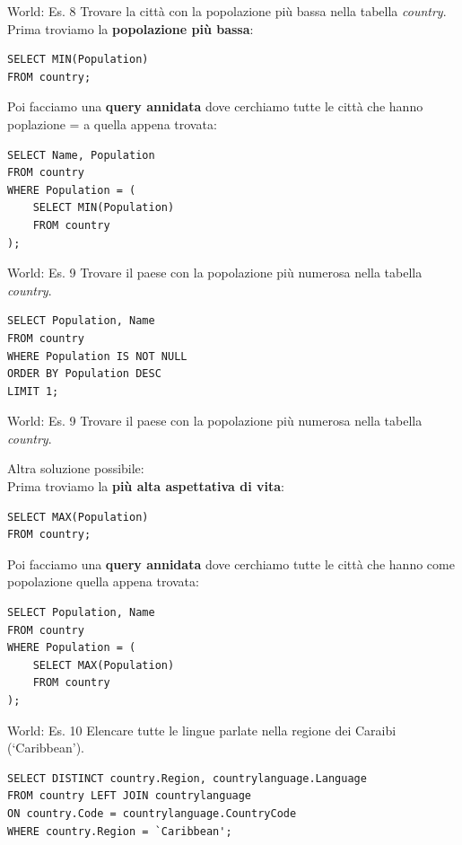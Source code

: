 %
\begin{frame}[fragile]{World: Es. 8}
Trovare la citt\`a con la popolazione pi\`u bassa nella tabella \textit{country}.
\pause
\\Prima troviamo la \textbf{popolazione pi\`u bassa}:
\begin{lstlisting}
SELECT MIN(Population)
FROM country;
\end{lstlisting}
\pause
Poi facciamo una \textbf{query annidata} dove cerchiamo tutte le citt\`a che hanno poplazione = a quella appena trovata:
\begin{lstlisting}
SELECT Name, Population
FROM country
WHERE Population = (
    SELECT MIN(Population)
    FROM country
);
\end{lstlisting}
\end{frame}
%
\begin{frame}[fragile]{World: Es. 9}
Trovare il paese con la popolazione pi\`u numerosa nella tabella \textit{country}.
\pause
\begin{lstlisting}
SELECT Population, Name
FROM country
WHERE Population IS NOT NULL
ORDER BY Population DESC
LIMIT 1;
\end{lstlisting}
\end{frame}
%
\begin{frame}[fragile]{World: Es. 9}
Trovare il paese con la popolazione pi\`u numerosa nella tabella \textit{country}.

Altra soluzione possibile:
\pause
\\Prima troviamo la \textbf{pi\`u alta aspettativa di vita}:
\begin{lstlisting}
SELECT MAX(Population)
FROM country;
\end{lstlisting}
\pause
Poi facciamo una \textbf{query annidata} dove cerchiamo tutte le citt\`a che hanno come popolazione quella appena trovata:
\begin{lstlisting}
SELECT Population, Name
FROM country
WHERE Population = (
    SELECT MAX(Population)
    FROM country
);
\end{lstlisting}
\end{frame}
%
\begin{frame}[fragile]{World: Es. 10}
Elencare tutte le lingue parlate nella regione dei Caraibi (`Caribbean'). 
\pause
\begin{lstlisting}
SELECT DISTINCT country.Region, countrylanguage.Language
FROM country LEFT JOIN countrylanguage
ON country.Code = countrylanguage.CountryCode
WHERE country.Region = `Caribbean';
\end{lstlisting}
\end{frame}
